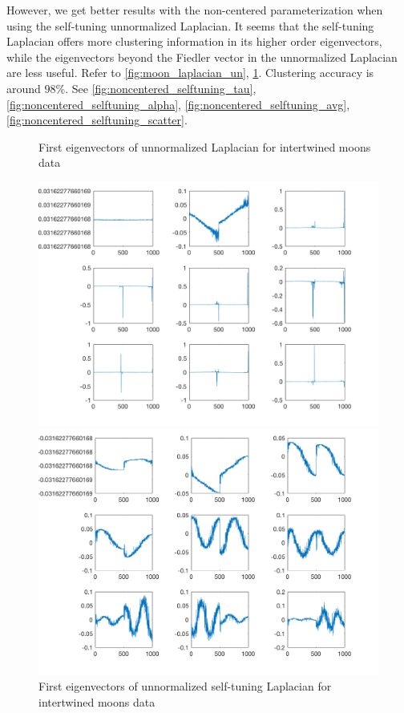 \documentclass{siamart1116}
\begin{document}
However, we get better results with the non-centered parameterization when using the self-tuning unnormalized Laplacian. It seems that the self-tuning Laplacian offers more clustering information in its higher order eigenvectors, while the eigenvectors beyond the Fiedler vector in the unnormalized Laplacian are less useful. Refer to \cref{fig:moon_laplacian_un}, \cref{fig:moon_laplacian_selftuning}. Clustering accuracy is around $98\%$. See \cref{fig:noncentered_selftuning_tau}, \cref{fig:noncentered_selftuning_alpha}, \cref{fig:noncentered_selftuning_avg}, \cref{fig:noncentered_selftuning_scatter}.

\begin{figure}[!htb]
    \begin{minipage}{0.48\textwidth}
        \centering
        \caption{\label{fig:moon_laplacian_un} First eigenvectors of unnormalized Laplacian for intertwined moons data}
        \includegraphics[width=\linewidth]{graphics/moon_laplacian_un.png}
    \end{minipage} \hfill
    \begin{minipage}{0.48\textwidth}
        \centering
        \caption{\label{fig:moon_laplacian_selftuning} First eigenvectors of unnormalized self-tuning Laplacian for intertwined moons data}
        \includegraphics[width=\linewidth]{graphics/moon_laplacian_selftuning.png}
    \end{minipage}
\end{figure}
\end{document}
